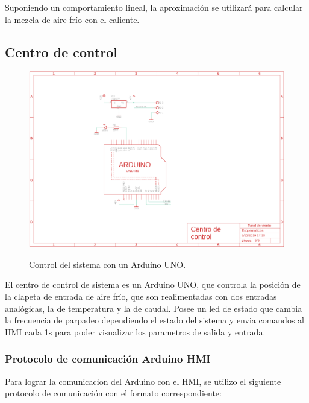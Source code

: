 \documentclass[12pt]{article}
\begin{document}
Suponiendo un comportamiento lineal, la aproximación se utilizará para calcular la mezcla de aire frío con el caliente.

\subsection{Centro de control}

\begin{figure}[H]
\centering
\includegraphics[scale=0.6]{src/imagenes/Centro_de_control.png}
\label{fgr:Centro_de_control}
\caption{Control del sistema con un Arduino UNO.}
\end{figure}

El centro de control de sistema es un Arduino UNO, que controla la posición de la clapeta de entrada de aire frío, que son realimentadas con dos entradas analógicas, la de temperatura y la de caudal. Posee un led de estado que cambia la frecuencia de parpadeo dependiendo el estado del sistema y envia comandos al HMI cada 1s para poder visualizar los parametros de salida y entrada.

\subsubsection{Protocolo de comunicación Arduino HMI}
Para lograr la comunicacion del Arduino con el HMI, se utilizo el siguiente protocolo de comunicación con el formato correspondiente:
\end{document}
